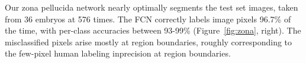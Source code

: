 
 Our zona pellucida network nearly optimally segments the test set images, taken from 36 embryos at 576 times. The FCN correctly labels image pixels 96.7\% of the time, with per-class accuracies between 93-99\% (Figure~\ref{fig:zona}, right). The misclassified pixels arise mostly at region boundaries, roughly corresponding to the few-pixel human labeling inprecision at region boundaries.


